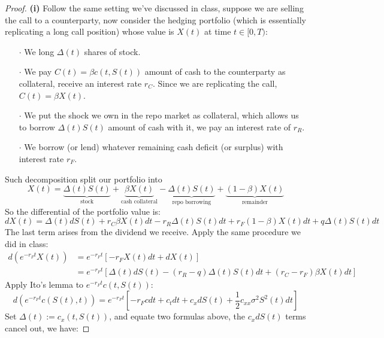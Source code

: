 \documentclass[a4paper, 10pt]{article}
\theoremstyle{definition}
\theoremstyle{hSol}
\begin{document}
\begin{proof} \textbf{(i)} Follow the same setting we've discussed in class, suppose we are selling the call to a counterparty, now consider the hedging portfolio (which is essentially replicating a long call position) whose value is $X(t)$ at time $t\in [0,T)$:
\begin{itemize}
  \item[$\cdot$] We long $\Delta(t)$ shares of stock.
  \item[$\cdot$] We pay $C(t)=\beta c(t,S(t))$ amount of cash to the counterparty as collateral, receive an interest rate $r_C$. Since we are replicating the call, $C(t)=\beta X(t)$.
  \item[$\cdot$] We put the shock we own in the repo market as collateral, which allows us to borrow $\Delta(t) S(t)$ amount of cash with it, we pay an interest rate of $r_R$.
  \item[$\cdot$] We borrow (or lend) whatever remaining cash deficit (or surplus) with interest rate $r_F$.
\end{itemize}
Such decomposition split our portfolio into
\begin{equation}
  X(t) = \underbrace{\Delta(t)S(t)}_{\text{stock}} + \underbrace{\beta X(t)}_{\text{cash collateral}} - \underbrace{\Delta(t)S(t)}_{\text{repo borrowing}} + \underbrace{(1-\beta)X(t)}_{\text{remainder}}
\end{equation}
So the differential of the portfolio value is:
\begin{equation}
  dX(t) = \Delta(t) dS(t) + r_C \beta X(t)dt - r_R\Delta(t)S(t)dt + r_F(1-\beta)X(t)dt +  q\Delta(t)S(t)dt
\end{equation}
The last term arises from the dividend we receive. Apply the same procedure we did in class:
\begin{equation}
  \begin{split}
    d(e^{-r_F t}X(t)) &= e^{-r_Ft}\left[-r_F X(t) dt + dX(t)\right] \\
    &=e^{-r_Ft}\left[\Delta(t) dS(t)  - (r_R-q)\Delta(t)S(t)dt + (r_C-r_F)\beta X(t)dt \right]
  \end{split}
\end{equation}
Apply Ito's lemma to $e^{-r_F t}c(t,S(t))$:
\begin{equation}
  d(e^{-r_F t}c(S(t),t)) = e^{-r_F t}\left[-r_Fc dt + c_t dt + c_x dS(t) + \frac{1}{2}c_{xx}\sigma^2 S^2(t)dt\right]
\end{equation}
Set $\Delta(t):=c_x(t,S(t))$, and equate two formulas above, the $c_x dS(t)$ terms cancel out, we have:

\end{proof}
\end{document}
